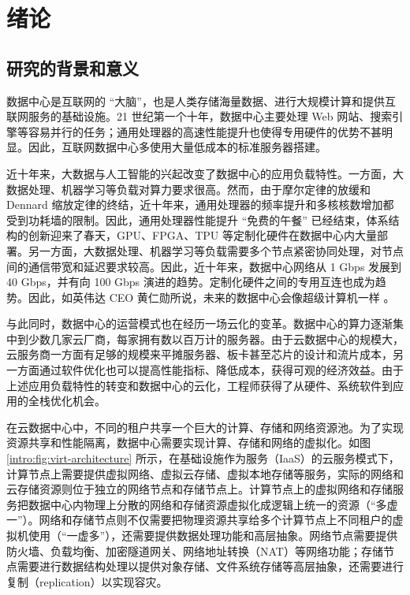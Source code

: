 \chapter{绪论}

\section{研究的背景和意义}


数据中心是互联网的 ``大脑''，也是人类存储海量数据、进行大规模计算和提供互联网服务的基础设施。21 世纪第一个十年，数据中心主要处理 Web 网站、搜索引擎等容易并行的任务；通用处理器的高速性能提升也使得专用硬件的优势不甚明显。因此，互联网数据中心多使用大量低成本的标准服务器搭建。

近十年来，大数据与人工智能的兴起改变了数据中心的应用负载特性。一方面，大数据处理、机器学习等负载对算力要求很高。然而，由于摩尔定律的放缓和 Dennard 缩放定律的终结，近十年来，通用处理器的频率提升和多核核数增加都受到功耗墙的限制。因此，通用处理器性能提升 ``免费的午餐'' 已经结束，体系结构的创新迎来了春天，GPU、FPGA、TPU 等定制化硬件在数据中心内大量部署。另一方面，大数据处理、机器学习等负载需要多个节点紧密协同处理，对节点间的通信带宽和延迟要求较高。因此，近十年来，数据中心网络从 1 Gbps 发展到 40 Gbps，并有向 100 Gbps 演进的趋势。定制化硬件之间的专用互连也成为趋势。因此，如英伟达 CEO 黄仁勋所说，未来的数据中心会像超级计算机一样 \cite{nvidia-datacenter}。

与此同时，数据中心的运营模式也在经历一场云化的变革。数据中心的算力逐渐集中到少数几家云厂商，每家拥有数以百万计的服务器。由于云数据中心的规模大，云服务商一方面有足够的规模来平摊服务器、板卡甚至芯片的设计和流片成本，另一方面通过软件优化也可以提高性能指标、降低成本，获得可观的经济效益。由于上述应用负载特性的转变和数据中心的云化，工程师获得了从硬件、系统软件到应用的全栈优化机会。

在云数据中心中，不同的租户共享一个巨大的计算、存储和网络资源池。为了实现资源共享和性能隔离，数据中心需要实现计算、存储和网络的虚拟化。如图 \ref{intro:fig:virt-architecture} 所示，在基础设施作为服务（IaaS）的云服务模式下，计算节点上需要提供虚拟网络、虚拟云存储、虚拟本地存储等服务，实际的网络和云存储资源则位于独立的网络节点和存储节点上。计算节点上的虚拟网络和存储服务把数据中心内物理上分散的网络和存储资源虚拟化成逻辑上统一的资源（``多虚一''）。网络和存储节点则不仅需要把物理资源共享给多个计算节点上不同租户的虚拟机使用（``一虚多''），还需要提供数据处理功能和高层抽象。网络节点需要提供防火墙、负载均衡、加密隧道网关、网络地址转换（NAT）等网络功能；存储节点需要进行数据结构处理以提供对象存储、文件系统存储等高层抽象，还需要进行复制（replication）以实现容灾。


